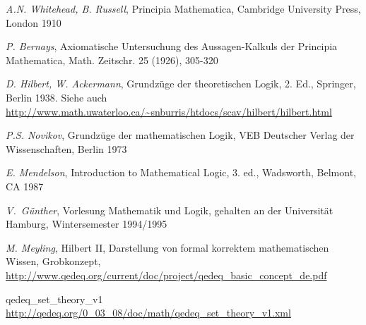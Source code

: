 \documentclass[a4paper,german,10pt,twoside]{book}
\theoremstyle{definition}
\theoremstyle{remark}
\begin{document}
\begin{thebibliography}{99}
 \emph{A.N. Whitehead, B. Russell}, Principia Mathematica, Cambridge University Press, London 1910

 \emph{P. Bernays}, Axiomatische Untersuchung des Aussagen-Kalkuls der {\glqq Principia Mathematica\grqq}, Math. Zeitschr. 25 (1926), 305-320

 \emph{D. Hilbert, W. Ackermann}, Grundz{\"u}ge der theoretischen Logik, 2. Ed., Springer, Berlin 1938. Siehe auch \url{http://www.math.uwaterloo.ca/~snburris/htdocs/scav/hilbert/hilbert.html}

 \emph{P.S. Novikov}, Grundz{\"u}ge der mathematischen Logik, VEB Deutscher Verlag der Wissenschaften, Berlin 1973

 \emph{E. Mendelson}, Introduction to Mathematical Logic, 3. ed., Wadsworth, Belmont, CA 1987

 \emph{V.~G{\"u}nther}, Vorlesung {\glqq Mathematik und Logik\grqq}, gehalten an der Universit{\"a}t Hamburg, Wintersemester 1994/1995

 \emph{M. Meyling}, Hilbert II, Darstellung von formal korrektem mathematischen Wissen, Grobkonzept, \url{http://www.qedeq.org/current/doc/project/qedeq_basic_concept_de.pdf}



 qedeq\_set\_theory\_v1 \url{http://qedeq.org/0_03_08/doc/math/qedeq_set_theory_v1.xml}


\end{thebibliography}
\backmatter

 \printindex
\end{document}
